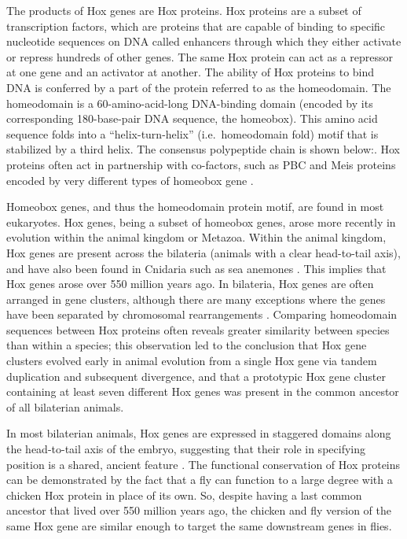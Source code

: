 The products of Hox genes are Hox proteins. Hox proteins are a subset of transcription factors, which are proteins that are capable of binding to specific nucleotide sequences on DNA called enhancers through which they either activate or repress hundreds of other genes. The same Hox protein can act as a repressor at one gene and an activator at another. The ability of Hox proteins to bind DNA is conferred by a part of the protein referred to as the homeodomain. The homeodomain is a 60-amino-acid-long DNA-binding domain (encoded by its corresponding 180-base-pair DNA sequence, the homeobox). This amino acid sequence folds into a ``helix-turn-helix'' (i.e.~homeodomain fold) motif that is stabilized by a third helix. The consensus polypeptide chain is shown below:. Hox proteins often act in partnership with co-factors, such as PBC and Meis proteins encoded by very different types of homeobox gene .

Homeobox genes, and thus the homeodomain protein motif, are found in most eukaryotes. Hox genes, being a subset of homeobox genes, arose more recently in evolution within the animal kingdom or Metazoa. Within the animal kingdom, Hox genes are present across the bilateria (animals with a clear head-to-tail axis), and have also been found in Cnidaria such as sea anemones . This implies that Hox genes arose over 550 million years ago. In bilateria, Hox genes are often arranged in gene clusters, although there are many exceptions where the genes have been separated by chromosomal rearrangements . Comparing homeodomain sequences between Hox proteins often reveals greater similarity between species than within a species; this observation led to the conclusion that Hox gene clusters evolved early in animal evolution from a single Hox gene via tandem duplication and subsequent divergence, and that a prototypic Hox gene cluster containing at least seven different Hox genes was present in the common ancestor of all bilaterian animals.

In most bilaterian animals, Hox genes are expressed in staggered domains along the head-to-tail axis of the embryo, suggesting that their role in specifying position is a shared, ancient feature . The functional conservation of Hox proteins can be demonstrated by the fact that a fly can function to a large degree with a chicken Hox protein in place of its own. So, despite having a last common ancestor that lived over 550 million years ago, the chicken and fly version of the same Hox gene are similar enough to target the same downstream genes in flies.

